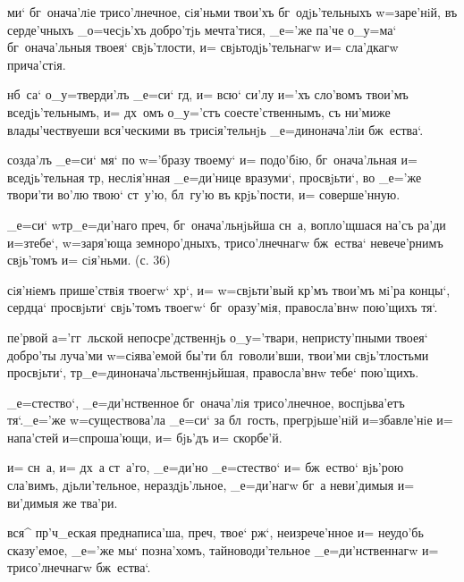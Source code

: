  ми` бг~онача'лiе трисо'лнечное, сiя'ньми 
твои'хъ бг~одjь'тельныхъ w=заре'нiй, въ серде'чныхъ 
_о=чесjь'хъ добро'тjь мечта'тися, _е='же па'че о_у=ма` 
бг~онача'льныя твоея` свjь'тлости, и= свjьтодjь'тельнагw 
и= сла'дкагw прича'стiя.

 нб~са` о_у=тверди'лъ _е=си` гд, и= всю` 
си'лу и='хъ сло'вомъ твои'мъ вседjь'тельнымъ, и= дх~омъ 
о_у='стъ соесте'ственнымъ, съ ни'миже влады'чествуеши 
вся'ческими въ трисiя'тельнjь _е=динонача'лiи бж~ества`.

  созда'лъ _е=си` мя` по w='бразу 
твоему` и= подо'бiю, бг~онача'льная и= вседjь'тельная 
тр, неслiя'нная _е=ди'нице вразуми`, просвjьти`, во 
_е='же твори'ти во'лю твою` ст~у'ю, бл~гу'ю въ 
крjь'пости, и= соверше'нную.

  _е=си` w\т тр _е=ди'наго 
преч, бг~онача'льнjьйша сн~а, вопло'щшася на'съ 
ра'ди и=з\ъ тебе`, w=заря'юща земноро'дныхъ, 
трисо'лнечнагw бж~ества` невече'рнимъ свjь'томъ и= 
сiя'ньми. (с. 36)


 сiя'нiемъ прише'ствiя твоегw` 
хр`, и= w=свjьти'вый кр'мъ твои'мъ мi'ра концы`, 
сердца` просвjьти` свjь'томъ твоегw` бг~оразу'мiя, 
правосла'внw пою'щихъ тя`.

 пе'рвой а='гг~льской непосре'дственнjь 
о_у='твари, непристу'пными твоея` добро'ты луча'ми 
w=сiява'емой бы'ти бл~говоли'вши, твои'ми свjь'тлостьми 
просвjьти`, тр _е=динонача'льственнjьйшая, 
правосла'внw тебе` пою'щихъ.

 _е=стество`, _е=ди'нственное бг~онача'лiя 
трисо'лнечное, воспjьва'етъ тя`._е='же w=существова'ла 
_е=си` за бл~гость, прегрjьше'нiй и=збавле'нiе и= 
напа'стей и=спроша'ющи, и= бjь'дъ и= скорбе'й.

  и= сн~а, и= дх~а ст~а'го, _е=ди'но 
_е=стество` и= бж~ество` вjь'рою сла'вимъ, дjьли'тельное, 
нераздjь'льное, _е=ди'нагw бг~а неви'димыя и= ви'димыя же 
тва'ри.

  вся^ пр'ч_еская 
преднаписа'ша, преч, твое` рж`, неизрече'нное 
и= неудо'бь сказу'емое, _е='же мы` позна'хомъ, 
тайноводи'тельное _е=ди'нственнагw и= трисо'лнечнагw 
бж~ества`.


